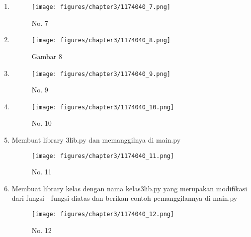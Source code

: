 \begin{enumerate}
            \item 
            \begin{figure}[ht]
            \centerline{\texttt{[image: figures/chapter3/1174040\_7.png]}}
            \caption{No. 7}
            \label{1174040_no7}
            \end{figure}

            \item 
\begin{figure}[ht]

            \centerline{\texttt{[image: figures/chapter3/1174040\_8.png]}}

            \caption{Gambar 8}

            \label{1174040_8}

            \end{figure}

            \item 

\begin{figure}[ht]
            \centerline{\texttt{[image: figures/chapter3/1174040\_9.png]}}
            \caption{No. 9}
            \label{1174040_no9}
            \end{figure}

            \item 

            \begin{figure}[ht]

            \centerline{\texttt{[image: figures/chapter3/1174040\_10.png]}}
            \caption{No. 10}
            \label{1174040_no10}
            \end{figure}

            \item Membuat library 3lib.py dan memanggilnya di main.py
            
            \begin{figure}[ht]

            \centerline{\texttt{[image: figures/chapter3/1174040\_11.png]}}
            \caption{No. 11}
            \label{1174040_no11}
            \end{figure}

            \item Membuat library kelas dengan nama kelas3lib.py yang merupakan modifikasi dari fungsi - fungsi diatas dan berikan contoh pemanggilannya di main.py
            
            \begin{figure}[ht]

            \centerline{\texttt{[image: figures/chapter3/1174040\_12.png]}}
            \caption{No. 12}
            \label{1174040_no12}
            \end{figure}

        \end{enumerate}
